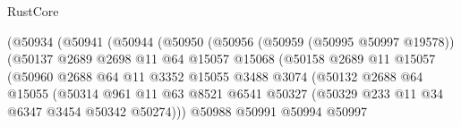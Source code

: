 \begin{lexlean}{RustCore}
\begin{coremodule}
                                (@50934
                                  (@50941
                                    (@50944
                                      (@50950
                                        (@50956
                                          (@50959 (@50995 @50997 @19578))
                                          (@50137
                                            @2689
                                            @2698
                                            @11
                                            @64
                                            @15057
                                            @15068
                                            (@50158
                                              @2689
                                              @11
                                              @15057
                                              (@50960
                                                @2688
                                                @64
                                                @11
                                                @3352
                                                @15055
                                                @3488
                                                @3074
                                                (@50132
                                                  @2688
                                                  @64
                                                  @15055
                                                  (@50314
                                                    @961
                                                    @11
                                                    @63
                                                    @8521
                                                    @6541
                                                    @50327
                                                    (@50329
                                                      @233
                                                      @11
                                                      @34
                                                      @6347
                                                      @3454
                                                      @50342
                                                      @50274)))
                                                @50988
                                                @50991
                                                @50994
                                                @50997

\end{coremodule}
\end{lexlean}
